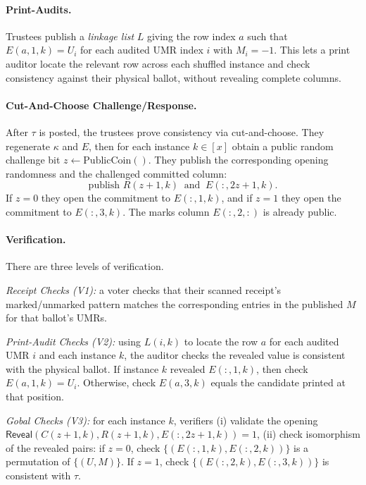 \paragraph{Print-Audits.}
Trustees publish a \emph{linkage list} $L$ giving the row index $a$ such that $E(a,1,k)=U_i$ for each audited UMR index $i$ with $M_i=-1$. 
This lets a print auditor locate the relevant row across each shuffled instance and check consistency against their physical ballot, without revealing complete columns.  

\paragraph{Cut-And-Choose Challenge/Response.}
After $\tau$ is posted, the trustees prove consistency via cut-and-choose.
They regenerate $\kappa$ and $E$, then for each instance $k\in[x]$ obtain a public random challenge bit $z\leftarrow\mathrm{PublicCoin}()$.
They publish the corresponding opening randomness and the challenged committed column:
\[
\text{publish } R(z{+}1,k)\ \text{ and }\ E(:,2z{+}1,k).
\]
If $z=0$ they open the commitment to $E(:,1,k)$, and if $z=1$ they open the commitment to $E(:,3,k)$. 
The marks column $E(:,2,:)$ is already public.

\paragraph{Verification.}
There are three levels of verification.

\emph{Receipt Checks (V1):} a voter checks that their scanned receipt’s marked/unmarked pattern matches the corresponding
entries in the published $M$ for that ballot’s UMRs.

\emph{Print-Audit Checks (V2):} using $L(i,k)$ to locate the row $a$ for each audited UMR $i$ and each instance $k$,
the auditor checks the revealed value is consistent with the physical ballot.
If instance $k$ revealed $E(:,1,k)$, then check $E(a,1,k)=U_i$.
Otherwise, check $E(a,3,k)$ equals the candidate printed at that position.

\emph{Gobal Checks (V3):} for each instance $k$, verifiers 
(i) validate the opening $\mathsf{Reveal}(C(z{+}1,k),R(z{+}1,k),E(:,2z{+}1,k))=1$,
(ii) check isomorphism of the revealed pairs:
if $z=0$, check $\{(E(:,1,k),E(:,2,k))\}$ is a permutation of $\{(U,M)\}$. 
If $z=1$, check $\{(E(:,2,k),E(:,3,k))\}$ is consistent with $\tau$.

